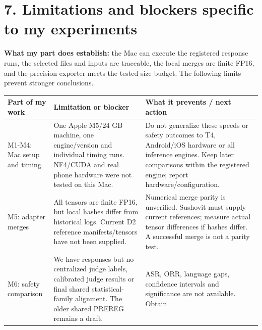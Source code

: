 \documentclass[11pt,a4paper]{article}
\begin{document}
\section{7. Limitations and blockers specific to my
experiments}\label{limitations-and-blockers-specific-to-my-experiments}

\textbf{What my part does establish:} the Mac can execute the registered
response runs, the selected files and inputs are traceable, the local
merges are finite FP16, and the precision exporter meets the tested size
budget. The following limits prevent stronger conclusions.

{\def\LTcaptype{none} %
\begin{longtable}[]{@{}
  >{\raggedright\arraybackslash}p{}
  >{\raggedright\arraybackslash}p{}
  >{\raggedright\arraybackslash}p{}@{}}
\toprule\noalign{}
\begin{minipage}[b]{\linewidth}\raggedright
Part of my work
\end{minipage} & \begin{minipage}[b]{\linewidth}\raggedright
Limitation or blocker
\end{minipage} & \begin{minipage}[b]{\linewidth}\raggedright
What it prevents / next action
\end{minipage} \\
\midrule\noalign{}
\endhead
\bottomrule\noalign{}
\endlastfoot
M1-M4: Mac setup and timing & One Apple M5/24 GB machine, one
engine/version and individual timing runs. NF4/CUDA and real phone
hardware were not tested on this Mac. & Do not generalize these speeds
or safety outcomes to T4, Android/iOS hardware or all inference engines.
Keep later comparisons within the registered engine; report
hardware/configuration. \\
M5: adapter merges & All tensors are finite FP16, but local hashes
differ from historical logs. Current D2 reference manifests/tensors have
not been supplied. & Numerical merge parity is unverified. Sushovit must
supply current references; measure actual tensor differences if hashes
differ. A successful merge is not a parity test. \\
M6: safety comparison & We have responses but no centralized judge
labels, calibrated judge results or final shared statistical-family
alignment. The older shared PREREG remains a draft. & ASR, ORR, language
gaps, confidence intervals and significance are not available. Obtain

\end{longtable}}
\end{document}
